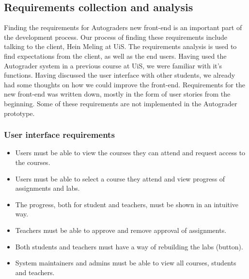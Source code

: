 \subsection{Requirements collection and analysis}
Finding the requirements for Autograders new front-end is an important part of the development process. Our process of finding these requirements include talking to the client, Hein Meling at UiS. The requirements analysis is used to find expectations from the client, as well as the end users. Having used the Autograder system in a previous course at UiS, we were familiar with it's functions. 
Having discussed the user interface with other students, we already had some thoughts on how we could improve the front-end. Requirements for the new front-end was written down, mostly in the form of user stories from the beginning. Some of these requirements are not implemented in the Autograder prototype.

\subsubsection{User interface requirements}
\begin{itemize}
\item Users must be able to view the courses they can attend and request access to the courses.
\item Users must be able to select a course they attend and view progress of assignments and labs.
\item The progress, both for student and teachers, must be shown in an intuitive way.
\item Teachers must be able to approve and remove approval of assignments.
\item Both students and teachers must have a way of rebuilding the labs (button).
\item System maintainers and admins must be able to view all courses, students and teachers.
\end{itemize}

